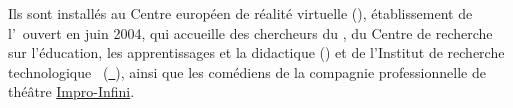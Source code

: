 Ils sont installés au Centre européen de réalité virtuelle (\href{http://www.cerv.fr/}{\cerv}), 
établissement de l'\enib\ ouvert en juin 2004, qui accueille des chercheurs 
du \href{http://www.lab-sticc.fr/}{\labsticc}, 
du Centre de recherche sur l’éducation, les apprentissages et la didactique (\href{http://cread.espe-bretagne.fr/}{\cread}) et 
de l'Institut de recherche technologique \bcom\ (\href{http://b-com.com/}{\irt\ \bcom}),
ainsi que les comédiens de la compagnie professionnelle de théâtre \href{http://www.impro-infini.fr/}{Impro-Infini}.


